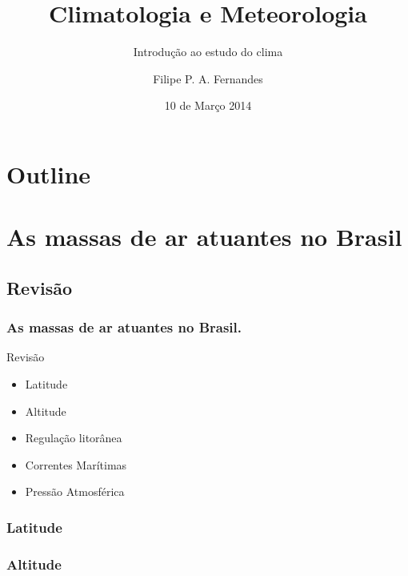 \title[Aula 04]{Climatologia e Meteorologia}
\subtitle{Introdução ao estudo do clima}
\author[Filipe Fernandes]{Filipe P. A. Fernandes}
\date[Março 2014]{10 de Março 2014}




\begin{frame}[plain]
  \titlepage
\end{frame}

\section*{Outline}
\begin{frame}
\tableofcontents
\end{frame}

\section{As massas de ar atuantes no Brasil}

\subsection{Revisão}
\begin{frame}
\frametitle{As massas de ar atuantes no Brasil.}
  \begin{block}{Revisão}
    \begin{itemize}[<+-| alert@+>]
      \item Latitude
      \item Altitude
      \item Regulação litorânea
      \item Correntes Marítimas
      \item Pressão Atmosférica
    \end{itemize}
  \end{block}
\end{frame}


\begin{frame}
  \frametitle{Latitude}
  \begin{center}
  \end{center}
\end{frame}


\begin{frame}
  \frametitle{Altitude}
  \begin{center}
  \end{center}
\end{frame}


